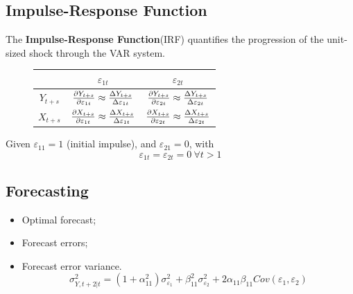 \documentclass[11pt]{article}
\begin{document}
        \subsection{Impulse-Response Function}
            \begin{definition}
                The \textbf{Impulse-Response Function}(IRF) quantifies the progression of the unit-sized shock through the VAR system.
                \begin{figure}[H]
                    \centering
                    \begin{tabular}{c|c|c}
                         & $\varepsilon_{1t}$ & $\varepsilon_{2t}$ \\
                         \hline
                         $Y_{t+s}$ 
                         & $\frac{\partial{Y_{t+s}}}{\partial{\varepsilon_{1t}}} \approx \frac{\Delta Y_{t+s}}{\Delta \varepsilon_{1t}}$ 
                         & $\frac{\partial{Y_{t+s}}}{\partial{\varepsilon_{2t}}} \approx \frac{\Delta Y_{t+s}}{\Delta \varepsilon_{2t}}$\\
                         $X_{t+s}$ 
                         & $\frac{\partial{X_{t+s}}}{\partial{\varepsilon_{1t}}} \approx \frac{\Delta X_{t+s}}{\Delta \varepsilon_{1t}}$ 
                         & $\frac{\partial{X_{t+s}}}{\partial{\varepsilon_{2t}}} \approx \frac{\Delta X_{t+s}}{\Delta \varepsilon_{2t}}$
                    \end{tabular}
                \end{figure}
            \end{definition}
            
            \begin{remark}
                Given $\varepsilon_{11} = 1$ (initial impulse), and $\varepsilon_{21} = 0$, with 
                \begin{equation}
                    \varepsilon_{1t} = \varepsilon_{2t} = 0\ \forall t > 1
                \end{equation}
            \end{remark}
        \subsection{Forecasting}
            \begin{itemize}
                \item Optimal forecast;
                \item Forecast errors;
                \item Forecast error variance.
                \begin{equation}
                    \sigma_{Y, t+2|t}^2 = (1 + \alpha_{11}^2) \sigma_{\varepsilon_1}^2 + \beta_{11}^2  \sigma_{\varepsilon_2}^2 + 2 \alpha_{11} \beta_{11} Cov(\varepsilon_1, \varepsilon_2)
                \end{equation}
            \end{itemize}
            
\end{document}
